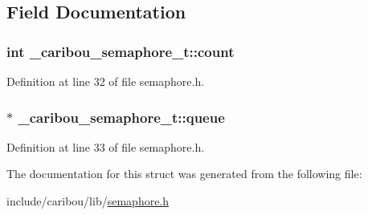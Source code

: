 \subsection{Field Documentation}
\hypertarget{struct__caribou__semaphore__t_ac20e6280acd9c0aadb09d81b55c6eb22}{
\subsubsection[{count}]{\setlength{\rightskip}{0pt plus 5cm}int \-\_\-caribou\-\_\-semaphore\-\_\-t\-::count}}\label{struct__caribou__semaphore__t_ac20e6280acd9c0aadb09d81b55c6eb22}


Definition at line 32 of file semaphore.\-h.

\hypertarget{struct__caribou__semaphore__t_a465e6ba07fd7c5130f9f3e47b4761729}{
\subsubsection[{queue}]{$\ast$ \-\_\-caribou\-\_\-semaphore\-\_\-t\-::queue}}\label{struct__caribou__semaphore__t_a465e6ba07fd7c5130f9f3e47b4761729}


Definition at line 33 of file semaphore.\-h.



The documentation for this struct was generated from the following file\-:\begin{DoxyCompactItemize}
\item 
include/caribou/lib/\hyperlink{semaphore_8h}{semaphore.\-h}\end{DoxyCompactItemize}
